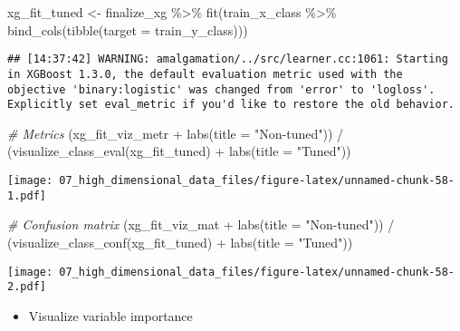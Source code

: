 \documentclass[
]{book}
\newenvironment{Shaded}{\begin{snugshade}}{\end{snugshade}}
\newcommand{\AttributeTok}[1]{\textcolor[rgb]{0.77,0.63,0.00}{#1}}
\newcommand{\CommentTok}[1]{\textcolor[rgb]{0.56,0.35,0.01}{\textit{#1}}}
\newcommand{\FunctionTok}[1]{\textcolor[rgb]{0.00,0.00,0.00}{#1}}
\newcommand{\NormalTok}[1]{#1}
\newcommand{\OtherTok}[1]{\textcolor[rgb]{0.56,0.35,0.01}{#1}}
\newcommand{\SpecialCharTok}[1]{\textcolor[rgb]{0.00,0.00,0.00}{#1}}
\newcommand{\StringTok}[1]{\textcolor[rgb]{0.31,0.60,0.02}{#1}}
\providecommand{\tightlist}{%
  \setlength{\itemsep}{0pt}\setlength{\parskip}{0pt}}
\begin{document}
\begin{Shaded}
\begin{Highlighting}[]
\NormalTok{xg\_fit\_tuned }\OtherTok{\textless{}{-}}\NormalTok{ finalize\_xg }\SpecialCharTok{\%\textgreater{}\%} 
  \FunctionTok{fit}\NormalTok{(train\_x\_class }\SpecialCharTok{\%\textgreater{}\%} \FunctionTok{bind\_cols}\NormalTok{(}\FunctionTok{tibble}\NormalTok{(}\AttributeTok{target =}\NormalTok{ train\_y\_class)))}
\end{Highlighting}
\end{Shaded}

\begin{verbatim}
## [14:37:42] WARNING: amalgamation/../src/learner.cc:1061: Starting in XGBoost 1.3.0, the default evaluation metric used with the objective 'binary:logistic' was changed from 'error' to 'logloss'. Explicitly set eval_metric if you'd like to restore the old behavior.
\end{verbatim}

\begin{Shaded}
\begin{Highlighting}[]
\CommentTok{\# Metrics }
\NormalTok{(xg\_fit\_viz\_metr }\SpecialCharTok{+} \FunctionTok{labs}\NormalTok{(}\AttributeTok{title =} \StringTok{"Non{-}tuned"}\NormalTok{)) }\SpecialCharTok{/}\NormalTok{ (}\FunctionTok{visualize\_class\_eval}\NormalTok{(xg\_fit\_tuned) }\SpecialCharTok{+} \FunctionTok{labs}\NormalTok{(}\AttributeTok{title =} \StringTok{"Tuned"}\NormalTok{))}
\end{Highlighting}
\end{Shaded}

\texttt{[image: 07\_high\_dimensional\_data\_files/figure-latex/unnamed-chunk-58-1.pdf]}

\begin{Shaded}
\begin{Highlighting}[]
\CommentTok{\# Confusion matrix }
\NormalTok{(xg\_fit\_viz\_mat }\SpecialCharTok{+} \FunctionTok{labs}\NormalTok{(}\AttributeTok{title =} \StringTok{"Non{-}tuned"}\NormalTok{)) }\SpecialCharTok{/}\NormalTok{ (}\FunctionTok{visualize\_class\_conf}\NormalTok{(xg\_fit\_tuned) }\SpecialCharTok{+} \FunctionTok{labs}\NormalTok{(}\AttributeTok{title =} \StringTok{"Tuned"}\NormalTok{))}
\end{Highlighting}
\end{Shaded}

\texttt{[image: 07\_high\_dimensional\_data\_files/figure-latex/unnamed-chunk-58-2.pdf]}

\begin{itemize}
\tightlist
\item
  Visualize variable importance
\end{itemize}
\end{document}

